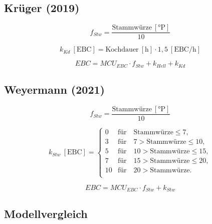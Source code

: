 \documentclass[a4paper,parskip=half]{scrartcl}
\newcommand{\MCUEBC}{\mathit{MCU}_{EBC}}
\newcommand{\EBC}{\mathit{EBC}}
\newcommand{\uebc}{\:[\textrm{EBC}]}
\newcommand{\uebch}{\:[\textrm{EBC/h}]}
\newcommand{\uplato}{\:[\textrm{°P}]}
\newcommand{\fstw}{f_{Stw}}
\newcommand{\khell}{k_{Hell}}
\newcommand{\kkd}{k_{Kd}}
\newcommand{\kstw}{k_{Stw}}
\newcommand{\uhour}{\:[\textrm{h}]}
\begin{document}
\subsection*{Krüger (2019)}

\begin{equation}
\fstw = \frac{\text{Stammwürze} \uplato}{10}
\label{eq:krugerstw}
\end{equation}

\begin{equation}
\kkd \uebc = \text{Kochdauer} \uhour \cdot 1,5 \uebch
\label{eq:krugerkkd}
\end{equation}

\begin{equation}
\EBC = \MCUEBC \cdot \fstw + \khell + \kkd
\label{eq:ebckruger}
\end{equation}






\subsection*{Weyermann (2021)}

\begin{equation}
\fstw = \frac{\text{Stammwürze} \uplato}{10}
\label{eq:weyermannstw}
\end{equation}

\begin{equation}
\kstw \uebc = \begin{cases}
0  & \text{für} \quad \text{Stammwürze} \le 7, \\
3  & \text{für} \quad 7 > \text{Stammwürze} \le 10, \\
5  & \text{für} \quad 10 > \text{Stammwürze} \le 15, \\
7  & \text{für} \quad 15 > \text{Stammwürze} \le 20, \\
10 & \text{für} \quad 20 > \text{Stammwürze}. \\
\end{cases}
\label{eq:weyermannkstw}
\end{equation}

\begin{equation}
\EBC = \MCUEBC \cdot \fstw + \kstw
\label{eq:ebcweyermann}
\end{equation}

\parencite{KrausWeyermann2021b}


\subsection*{Modellvergleich}
\end{document}
